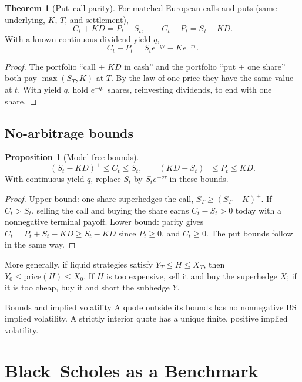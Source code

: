 \documentclass[10pt]{article}
\newcommand{\1}{\mathbf 1}
\theoremstyle{definition}
\newtheorem{proposition}[definition]{Proposition}
\newtheorem{theorem}[definition]{Theorem}
\begin{document}
\begin{theorem}[Put--call parity]
For matched European calls and puts (same underlying, \(K\), \(T\), and
settlement),
\[
\boxed{C_t+KD=P_t+S_t,\qquad C_t-P_t=S_t-KD.}
\]
With a known continuous dividend yield \(q\),
\[
C_t-P_t=S_te^{-q\tau}-Ke^{-r\tau}.
\]
\end{theorem}
\begin{proof}
The portfolio ``call \(+\) \(KD\) in cash'' and the portfolio
``put \(+\) one share'' both pay \(\max(S_T,K)\) at \(T\). By the law of one
price they have the same value at \(t\). With yield \(q\), hold
\(e^{-q\tau}\) shares, reinvesting dividends, to end with one share.
\end{proof}

\subsection{No-arbitrage bounds}

\begin{proposition}[Model-free bounds]
\[
\boxed{(S_t-KD)^+\le C_t\le S_t,\qquad (KD-S_t)^+\le P_t\le KD.}
\]
With continuous yield \(q\), replace \(S_t\) by \(S_te^{-q\tau}\) in these
bounds.
\end{proposition}
\begin{proof}
Upper bound: one share superhedges the call, \(S_T\ge(S_T-K)^+\). If
\(C_t>S_t\), selling the call and buying the share earns \(C_t-S_t>0\) today
with a nonnegative terminal payoff. Lower bound: parity gives
\(C_t=P_t+S_t-KD\ge S_t-KD\) since \(P_t\ge0\), and \(C_t\ge0\). The put
bounds follow in the same way.
\end{proof}

More generally, if liquid strategies satisfy \(Y_T\le H\le X_T\), then
\(Y_0\le\text{price}(H)\le X_0\). If \(H\) is too expensive, sell it and buy
the superhedge \(X\); if it is too cheap, buy it and short the subhedge \(Y\).

\begin{keyidea}{Bounds and implied volatility}
A quote outside its bounds has no nonnegative BS implied volatility.
A strictly interior quote has a unique finite, positive implied volatility.
\end{keyidea}

\section{Black--Scholes as a Benchmark}
\end{document}
